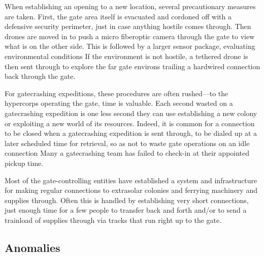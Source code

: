 When establishing an opening to a new location, 
several precautionary measures are taken. First, the 
gate area itself is evacuated and cordoned off with 
a defensive security perimeter, just in case anything 
hostile comes through. Then drones are moved in to 
push a micro fiberoptic camera through the gate to 
view what is on the other side. This is followed by a 
larger sensor package, evaluating environmental conditions
If the environment is not hostile, a tethered
drone is then sent through to explore the far gate environs
trailing a hardwired connection back through
the gate. 

For gatecrashing expeditions, these procedures are 
often rushed—to the hypercorps operating the gate, 
time is valuable. Each second wasted on a gatecrashing
expedition is one less second they can use establishing
a new colony or exploiting a new world of its
resources. Indeed, it is common for a connection to be 
closed when a gatecrashing expedition is sent through, 
to be dialed up at a later scheduled time for retrieval, 
so as not to waste gate operations on an idle connection
Many a gatecrashing team has failed to check-in
at their appointed pickup time.

Most of the gate-controlling entities have established
a system and infrastructure for making regular
connections to extrasolar colonies and ferrying machinery
and supplies through. Often this is handled by
establishing very short connections, just enough time 
for a few people to transfer back and forth and/or to 
send a trainload of supplies through via tracks that 
run right up to the gate.

\subsection{Anomalies}

